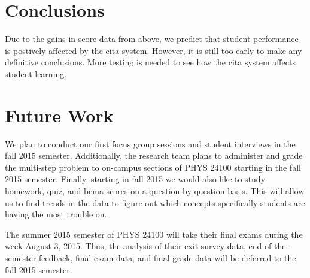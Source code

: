 \section{Conclusions}

Due to the gains in score data from above, we predict that student performance is postively affected by the \gls{cita} system. However, it is still too early to make any definitive conclusions. More testing is needed to see how the \gls{cita} system affects student learning.

\section{Future Work}

We plan to conduct our first focus group sessions and student interviews in the fall 2015 semester. Additionally, the research team plans to administer and grade the multi-step problem to on-campus sections of PHYS 24100 starting in the fall 2015 semester. Finally, starting in fall 2015 we would also like to study homework, quiz, and \gls{bema} scores on a question-by-question basis. This will allow us to find trends in the data to figure out which concepts specifically students are having the most trouble on.

The summer 2015 semester of PHYS 24100 will take their final exams during the week August 3, 2015. Thus, the analysis of their exit survey data, end-of-the-semester feedback, final exam data, and final grade data will be deferred to the fall 2015 semester.

